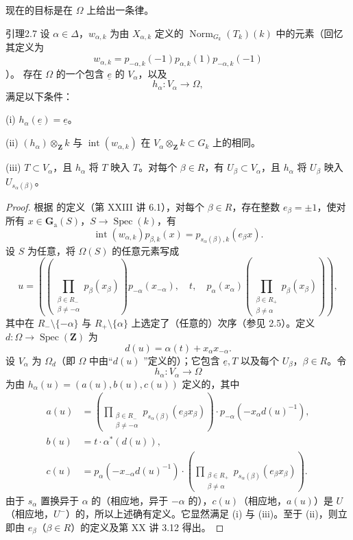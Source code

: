 现在的目标是在 $\Omega$ 上给出一条律。
\begin{SGAresult}{引理}{2.7}
设 $\alpha\in\Delta$，$w_{\alpha,k}$ 为由 $X_{\alpha,k}$ 定义的 $\operatorname{Norm}_{G_k}(T_k)(k)$ 中的元素（回忆其定义为
\[w_{\alpha,k}=p_{-\alpha,k}(-1)p_{\alpha,k}(1)p_{-\alpha,k}(-1)\]）。
存在 $\Omega$ 的一个包含 $\underline e$ 的 $V_\alpha$，以及
\[h_\alpha:V_\alpha\longrightarrow\Omega,\]
满足以下条件：

(i) $h_\alpha(\underline e)=\underline e$。

(ii) $(h_\alpha)\otimes_{\mathbf Z}k$ 与 $\operatorname{int}(w_{\alpha,k})$ 在 $V_\alpha\otimes_{\mathbf Z}k\subset G_k$ 上的相同。

(iii) $T\subset V_\alpha$，且 $h_\alpha$ 将 $T$ 映入 $T$。对每个 $\beta\in R$，有 $U_\beta\subset V_\alpha$，且 $h_\alpha$ 将 $U_\beta$ 映入 $U_{s_\alpha(\beta)}$。
\end{SGAresult}
\begin{proof}
根据 的定义（第 XXIII 讲 6.1），对每个 $\beta\in R$，存在整数 $e_\beta=\pm1$，使对所有 $x\in\mathbf G_{\mathrm a}(S)$，$S\to\operatorname{Spec}(k)$，有
\[\operatorname{int}(w_{\alpha,k})p_{\beta,k}(x)=p_{s_\alpha(\beta),k}(e_\beta x).\]
设 $S$ 为任意，将 $\Omega(S)$ 的任意元素写成
\[
u=\left(
 \left(\prod_{\substack{\beta\in R_-\\\beta\ne-\alpha}}p_\beta(x_\beta)\right)p_{-\alpha}(x_{-\alpha}),\quad
 t,\quad
 p_\alpha(x_\alpha)\left(\prod_{\substack{\beta\in R_+\\\beta\ne\alpha}}p_\beta(x_\beta)\right)
\right),
\]
其中在 $R_-\setminus\{-\alpha\}$ 与 $R_+\setminus\{\alpha\}$ 上选定了（任意的）次序（参见 2.5）。定义 $d:\Omega\to\operatorname{Spec}(\mathbf Z)$ 为
\[d(u)=\alpha(t)+x_\alpha x_{-\alpha}.\]
设 $V_\alpha$ 为 $\Omega_d$（即 $\Omega$ 中由“$d(u)$ ”定义的）；它包含 $\underline e,T$ 以及每个 $U_\beta$，$\beta\in R$。令
\[h_\alpha:V_\alpha\longrightarrow\Omega\]
为由 $h_\alpha(u)=(a(u),b(u),c(u))$ 定义的，其中
\begin{align*}
a(u)&=\left(\prod_{\substack{\beta\in R_-\\\beta\ne-\alpha}}p_{s_\alpha(\beta)}(e_\beta x_\beta)\right)\cdot p_{-\alpha}(-x_\alpha d(u)^{-1}),\\
b(u)&=t\cdot\alpha^*(d(u)),\\
c(u)&=p_\alpha(-x_{-\alpha}d(u)^{-1})\cdot\left(\prod_{\substack{\beta\in R_+\\\beta\ne\alpha}}p_{s_\alpha(\beta)}(e_\beta x_\beta)\right).
\end{align*}
由于 $s_\alpha$ 置换异于 $\alpha$ 的（相应地，异于 $-\alpha$ 的），$c(u)$（相应地，$a(u)$）是 $U$（相应地，$U^-$）的，所以上述确有定义。它显然满足 (i) 与 (iii)。至于 (ii)，则立即由 $e_\beta$（$\beta\in R$）的定义及第 XX 讲 3.12 得出。
\end{proof}

